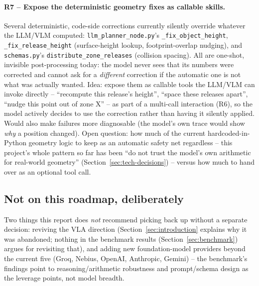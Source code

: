 \paragraph{R7 -- Expose the deterministic geometry fixes as callable
skills.} Several deterministic, code-side corrections currently silently
override whatever the LLM/VLM computed:
\texttt{llm\_planner\_node.py}'s \texttt{\_fix\_object\_height},
\texttt{\_fix\_release\_height} (surface-height lookup, footprint-overlap
nudging), and \texttt{schemas.py}'s \texttt{distribute\_zone\_releases}
(collision spacing). All are one-shot, invisible post-processing today: the
model never sees that its numbers were corrected and cannot ask for a
\emph{different} correction if the automatic one is not what was actually
wanted. Idea: expose them as callable tools the LLM/VLM can invoke directly
-- ``recompute this release's height'', ``space these releases apart'',
``nudge this point out of zone X'' -- as part of a multi-call interaction
(R6), so the model actively decides to use the correction rather than having
it silently applied. Would also make failures more diagnosable (the model's
own trace would show \emph{why} a position changed). Open question: how much
of the current hardcoded-in-Python geometry logic to keep as an automatic
safety net regardless -- this project's whole pattern so far has been ``do
not trust the model's own arithmetic for real-world geometry''
(Section~\ref{sec:tech-decisions}) -- versus how much to hand over as an
optional tool call.

\subsection{Not on this roadmap, deliberately}

Two things this report does \emph{not} recommend picking back up without a
separate decision: reviving the VLA direction (Section~\ref{sec:introduction}
explains why it was abandoned; nothing in the benchmark results
(Section~\ref{sec:benchmark}) argues for revisiting that), and adding new
foundation-model providers beyond the current five (Groq, Nebius, OpenAI,
Anthropic, Gemini) -- the benchmark's findings point to reasoning/arithmetic
robustness and prompt/schema design as the leverage points, not model
breadth.
